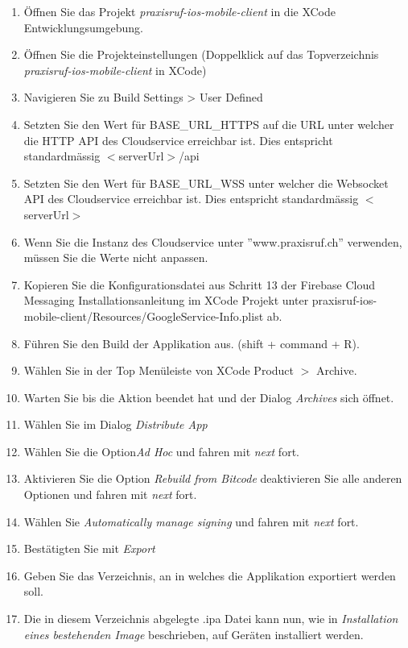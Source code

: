 \begin{enumerate}
    \item Öffnen Sie das Projekt \textit{praxisruf-ios-mobile-client} in die XCode Entwicklungsumgebung.
    \item Öffnen Sie die Projekteinstellungen (Doppelklick auf das Topverzeichnis \textit{praxisruf-ios-mobile-client} in XCode)
    \item Navigieren Sie zu Build Settings > User Defined
    \item Setzten Sie den Wert für BASE\_URL\_HTTPS auf die URL unter welcher die HTTP API des Cloudservice erreichbar ist. Dies entspricht standardmässig $<$serverUrl$>$/api
    \item Setzten Sie den Wert für BASE\_URL\_WSS unter welcher die Websocket API des Cloudservice erreichbar ist. Dies entspricht standardmässig $<$serverUrl$>$
    \item Wenn Sie die Instanz des Cloudservice unter ''www.praxisruf.ch'' verwenden, müssen Sie die Werte nicht anpassen.
    \item Kopieren Sie die Konfigurationsdatei aus Schritt 13 der Firebase Cloud Messaging Installationsanleitung im XCode Projekt unter praxisruf-ios-mobile-client/Resources/GoogleService-Info.plist ab.
    \item Führen Sie den Build der Applikation aus. (shift + command + R).
    \item Wählen Sie in der Top Menüleiste von XCode Product $>$ Archive.
    \item Warten Sie bis die Aktion beendet hat und der Dialog \textit{Archives} sich öffnet.
    \item Wählen Sie im Dialog \textit{Distribute App}
    \item Wählen Sie die Option\textit{Ad Hoc} und fahren mit \textit{next} fort.
    \item Aktivieren Sie die Option \textit{Rebuild from Bitcode} deaktivieren Sie alle anderen Optionen und fahren mit \textit{next} fort.
    \item Wählen Sie \textit{Automatically manage signing} und fahren mit \textit{next} fort.
    \item Bestätigten Sie mit \textit{Export}
    \item Geben Sie das Verzeichnis, an in welches die Applikation exportiert werden soll.
    \item Die in diesem Verzeichnis abgelegte .ipa Datei kann nun, wie in \textit{Installation eines bestehenden Image} beschrieben, auf Geräten installiert werden.
\end{enumerate}


\clearpage
